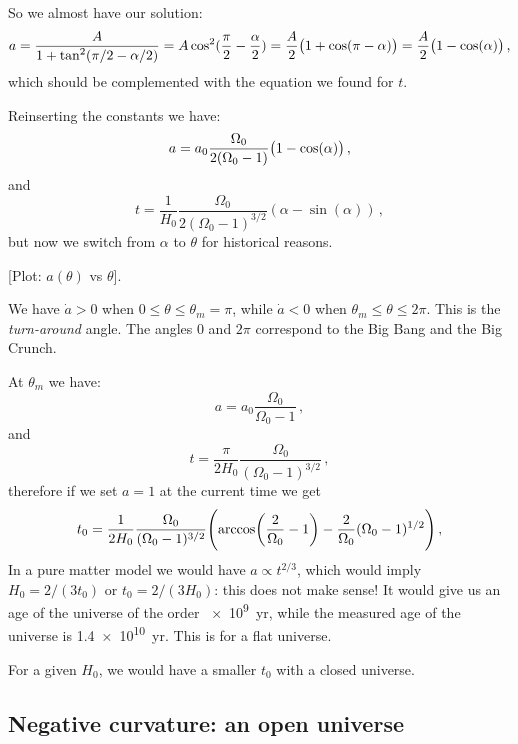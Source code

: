 \documentclass[main.tex]{subfiles}
\begin{document}
So we almost have our solution: 
%
\begin{equation}
  a = \frac{A}{1 + \tan^2(\pi /2 - \alpha /2)} = A \cos^2(\frac{\pi}{2} - \frac{\alpha}{2})  = \frac{A}{2} \qty(1+\cos(\pi - \alpha ) ) = \frac{A}{2} \qty(1- \cos(\alpha ) )
\,,
\end{equation}
which should be complemented with the equation we found for \(t\).

Reinserting the constants we have:
%
\begin{equation}
  a = a_0 \frac{\Omega_0}{2 (\Omega_0 -1)} \qty(1- \cos(\alpha ) ) 
\,,
\end{equation}
%
and
%
\begin{equation}
  t = \frac{1}{H_0 } \frac{\Omega_0}{2 (\Omega_0 -1)^{3/2}}(\alpha - \sin(\alpha ) )
\,,
\end{equation}
%
but now we switch from \(\alpha \) to \(\theta \) for historical reasons.

[Plot: \(a(\theta )\) vs \(\theta \)].

We have \(\dot{a} > 0 \)   when \(0 \leq \theta \leq \theta_m = \pi \), while \(\dot{a} < 0\) when \(\theta _m \leq \theta \leq 2 \pi \).
This is the \emph{turn-around} angle. The angles \(0\) and \(2 \pi \) correspond to the Big Bang and the Big Crunch.

At \(\theta _m\) we have: 
%
\begin{equation}
  a = a_0 \frac{\Omega_0}{\Omega_0 -1} 
\,,
\end{equation}
%
and 
%
\begin{equation}
  t = \frac{\pi}{2 H_0 } \frac{\Omega_0}{(\Omega_0 -1)^{3/2}}
\,,
\end{equation}
%
therefore if we set \(a=1\) at the current time we get 
%
\begin{equation}
  t_0 = \frac{1}{2H_0 } \frac{\Omega_0  }{(\Omega_0 -1)^{3/2}} \qty(\arccos (\frac{2}{\Omega_0 }-1) - \frac{2}{\Omega_0 } (\Omega_0 -1 )^{1/2})
\,,
\end{equation}
%
In a pure matter model we would have \(a \propto t^{2/3}\), which would imply \(H_0 = 2/(3 t_0 )\) or \(t_0 = 2 / (3 H_0 )\): this does not make sense! It would give us an age of the universe of the order \SI{e9}{yr}, while the measured age of the universe is \SI{1.4e10}{yr}.
This is for a flat universe.

For a given \(H_0 \), we would have a smaller \(t_0 \) with a closed universe.

\subsection{Negative curvature: an open universe}
\end{document}
